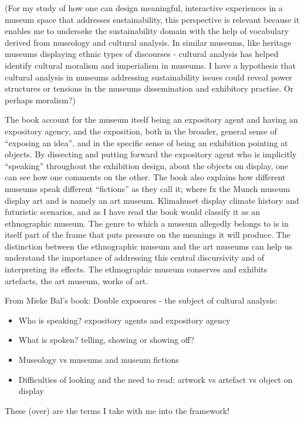 (For my study of how one can design meaningful, interactive experiences in a museum space that addresses sustainability, this perspective is relevant because it enables me to undersøke the sustainability domain with the help of vocabulary derived from museology and cultural analysis. In similar museums, like heritage museums displaying ethnic types of discourses - cultural analysis has helped identify cultural moralism and imperialism in museums. I have a hypothesis that cultural analysis in museums addressing sustainability issues could reveal power structures or tensions in the museums dissemination and exhibitory practise. Or perhaps moralism?)

The book account for the museum itself being an expository agent and having an expository agency, and the exposition, both in the broader, general sense of “exposing an idea”, and in the specific sense of being an exhibition pointing at objects. By dissecting and putting forward the expository agent who is implicitly “speaking” throughout the exhibition design, about the objects on display, one can see how one comments on the other. The book also explains how different museums speak different “fictions” as they call it; where fx the Munch museum display art and is namely an art museum. Klimahuset display climate history and futuristic scenarios, and as I have read the book would classify it as an ethnographic museum. The genre to which a museum allegedly belongs to is in itself part of the frame that puts pressure on the meanings it will produce. The distinction between the ethnographic museum and the art museums can help us understand the importance of addressing this central discursivity and of interpreting its effects. The ethnographic museum conserves and exhibits artefacts, the art museum, works of art.

\break
From Mieke Bal’s book: Double exposures - the subject of cultural analysis:
\begin{itemize}
    \item Who is speaking? expository agents and expository agency
    \item What is spoken? telling, showing or showing off?
    \item Museology vs museums and museum fictions
    \item Difficulties of looking and the need to read: artwork vs artefact vs object on display
\end{itemize}


These (over) are the terms I take with me into the framework!
